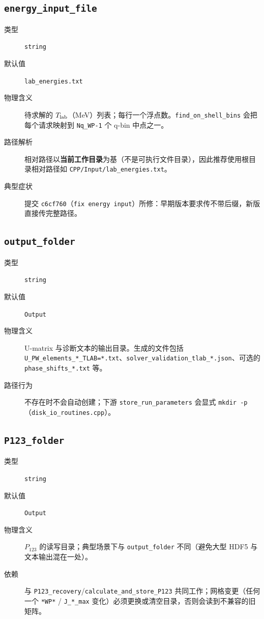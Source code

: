 \subsection{\texttt{energy\_input\_file}}

\begin{description}
  \item[类型] \texttt{string}
  \item[默认值] \texttt{lab\_energies.txt}
  \item[物理含义] 待求解的 \({T_{\text{lab}}}\)（\si{MeV}）列表；每行一个浮点数。\texttt{find\_on\_shell\_bins} 会把每个请求映射到 \texttt{Nq\_WP-1} 个 q-bin 中点之一。
  \item[路径解析] 相对路径以\textbf{当前工作目录}为基（不是可执行文件目录），因此推荐使用根目录相对路径如 \texttt{CPP/Input/lab\_energies.txt}。
  \item[典型症状] 提交 \texttt{c6cf760}（\texttt{fix energy input}）所修：早期版本要求传不带后缀，新版直接传完整路径。
\end{description}

\subsection{\texttt{output\_folder}}

\begin{description}
  \item[类型] \texttt{string}
  \item[默认值] \texttt{Output}
  \item[物理含义] U-matrix 与诊断文本的输出目录。生成的文件包括 \texttt{U\_PW\_elements\_*\_TLAB=*.txt}、\texttt{solver\_validation\_tlab\_*.json}、可选的 \texttt{phase\_shifts\_*.txt} 等。
  \item[路径行为] 不存在时不会自动创建；下游 \texttt{store\_run\_parameters} 会显式 \texttt{mkdir -p}（\texttt{disk\_io\_routines.cpp}）。
\end{description}

\subsection{\texttt{P123\_folder}}

\begin{description}
  \item[类型] \texttt{string}
  \item[默认值] \texttt{Output}
  \item[物理含义] \(P_{123}\) 的读写目录；典型场景下与 \texttt{output\_folder} 不同（避免大型 HDF5 与文本输出混在一处）。
  \item[依赖] 与 \texttt{P123\_recovery}/\texttt{calculate\_and\_store\_P123} 共同工作；网格变更（任何一个 \texttt{*WP*} / \texttt{J\_*\_max} 变化）必须更换或清空目录，否则会读到不兼容的旧矩阵。
\end{description}

